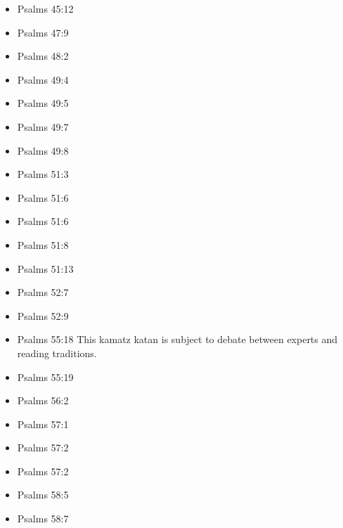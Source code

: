 \documentclass[14pt]{book}
\begin{document}
\begin{multicols}{2}
\begin{itemize}
\item Psalms 45:12

\item Psalms 47:9

\item Psalms 48:2

\item Psalms 49:4

\item Psalms 49:5

\item Psalms 49:7

\item Psalms 49:8

\item Psalms 51:3

\item Psalms 51:6

\item Psalms 51:6

\item Psalms 51:8

\item Psalms 51:13


\item Psalms 52:7
	
	\item Psalms 52:9
	
	\item Psalms 55:18 This kamatz katan is subject to debate between experts and reading traditions.
	
	\item Psalms 55:19
	
	\item Psalms 56:2
	
	\item Psalms 57:1

\item Psalms 57:2

\item Psalms 57:2

\item Psalms 58:5

\item Psalms 58:7


\end{itemize}
\end{multicols}
\end{document}

